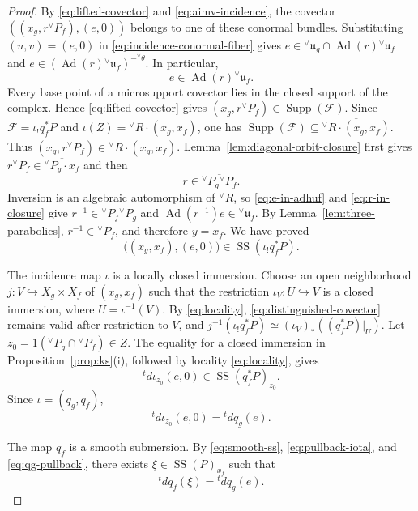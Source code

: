 \documentclass[10pt]{amsart}
\numberwithin{equation}{section}
\theoremstyle{plain}
\theoremstyle{definition}
\theoremstyle{remark}
\newcommand{\fu}{\mathfrak u}
\newcommand{\vR}{{}^{\vee}R}
\newcommand{\vP}{{}^{\vee}P}
\newcommand{\vfu}{{}^{\vee}\fu}
\newcommand{\vtheta}{{}^{\vee}\theta}
\newcommand{\cF}{\mathcal F}
\newcommand{\SSupp}{\operatorname{SS}}
\begin{document}
\begin{proof}
By \eqref{eq:lifted-covector} and \eqref{eq:aimv-incidence}, the covector
$((x_g,r\vP_f),(e,0))$ belongs to one of these conormal bundles.
Substituting $(u,v)=(e,0)$ in \eqref{eq:incidence-conormal-fiber} gives
$e\in\vfu_g\cap\operatorname{Ad}(r)\vfu_f$ and
$e\in(\operatorname{Ad}(r)\vfu_f)^{-\vtheta}$.
In particular,
\begin{equation}\label{eq:e-in-adhuf}
 e\in\operatorname{Ad}(r)\vfu_f.
\end{equation}
Every base point of a microsupport covector lies in the closed support of the
complex. Hence \eqref{eq:lifted-covector} gives
$(x_g,r\vP_f)\in\operatorname{Supp}(\cF)$.
Since $\cF=\iota_!q_f^*P$ and
$\iota(Z)=\vR\cdot(x_g,x_f)$, one has
$\operatorname{Supp}(\cF)\subseteq\overline{\vR\cdot(x_g,x_f)}$.
Thus $(x_g,r\vP_f)\in\overline{\vR\cdot(x_g,x_f)}$.
Lemma~\ref{lem:diagonal-orbit-closure} first gives
$r\vP_f\in\overline{\vP_g\cdot x_f}$ and then
\begin{equation}\label{eq:r-in-closure}
 r\in\overline{\vP_g\vP_f}.
\end{equation}
Inversion is an algebraic automorphism of $\vR$, so
\eqref{eq:e-in-adhuf} and \eqref{eq:r-in-closure} give
$r^{-1}\in\overline{\vP_f\vP_g}$ and
$\operatorname{Ad}(r^{-1})e\in\vfu_f$.
By Lemma~\ref{lem:three-parabolics}, $r^{-1}\in\vP_f$, and therefore
$y=x_f$. We have proved
\begin{equation}\label{eq:distinguished-covector}
  \bigl((x_g,x_f),(e,0)\bigr)
  \in\SSupp(\iota_!q_f^*P).
\end{equation}

The incidence map $\iota$ is a locally closed immersion. Choose an open
neighborhood $j:V\hookrightarrow X_g\times X_f$ of $(x_g,x_f)$ such that
the restriction $\iota_V:U\hookrightarrow V$ is a
closed immersion, where $U=\iota^{-1}(V)$. By \eqref{eq:locality},
\eqref{eq:distinguished-covector} remains valid after restriction to $V$,
and $j^{-1}(\iota_!q_f^*P)\simeq(\iota_V)_*((q_f^*P)|_U)$.
Let $z_0=1(\vP_g\cap\vP_f)\in Z$. The equality for a closed immersion in
Proposition~\ref{prop:ks}(i), followed by locality
\eqref{eq:locality}, gives
\begin{equation}\label{eq:pullback-iota}
  {}^td\iota_{z_0}(e,0)
  \in\SSupp(q_f^*P)_{z_0}.
\end{equation}
Since $\iota=(q_g,q_f)$,
\begin{equation}\label{eq:qg-pullback}
  {}^td\iota_{z_0}(e,0)
  ={}^tdq_g(e).
\end{equation}

The map $q_f$ is a smooth submersion. By \eqref{eq:smooth-ss}, \eqref{eq:pullback-iota}, and \eqref{eq:qg-pullback}, there exists
$\xi\in\SSupp(P)_{x_f}$
such that
\begin{equation}\label{eq:pullback-equality}
  {}^tdq_f(\xi)
  ={}^tdq_g(e).
\end{equation}


\end{proof}
\end{document}
